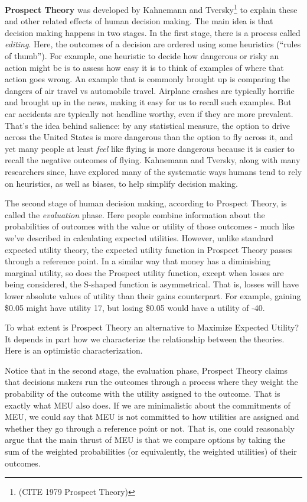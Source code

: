 \documentclass[]{tufte-book}
\begin{document}
\textbf{Prospect Theory} was developed by Kahnemann and Tversky\footnote{(CITE 1979 Prospect Theory)} to explain these and other related effects of human decision making. The main idea is that decision making happens in two stages. In the first stage, there is a process called \emph{editing}. Here, the outcomes of a decision are ordered using some heuristics (``rules of thumb''). For example, one heuristic to decide how dangerous or risky an action might be is to assess how easy it is to think of examples of where that action goes wrong. An example that is commonly brought up is comparing the dangers of air travel vs automobile travel. Airplane crashes are typically horrific and brought up in the news, making it easy for us to recall such examples. But car accidents are typically not headline worthy, even if they are more prevalent. That's the idea behind salience: by any statistical measure, the option to drive across the United States is more dangerous than the option to fly across it, and yet many people at least \emph{feel} like flying is more dangerous because it is easier to recall the negative outcomes of flying. Kahnemann and Tversky, along with many researchers since, have explored many of the systematic ways humans tend to rely on heuristics, as well as biases, to help simplify decision making.

The second stage of human decision making, according to Prospect Theory, is called the \emph{evaluation} phase. Here people combine information about the probabilities of outcomes with the value or utility of those outcomes - much like we've described in calculating expected utilities. However, unlike standard expected utility theory, the expected utility function in Prospect Theory passes through a reference point. In a similar way that money has a diminishing marginal utility, so does the Prospect utility function, except when losses are being considered, the S-shaped function is asymmetrical. That is, losses will have lower absolute values of utility than their gains counterpart. For example, gaining \$0.05 might have utility 17, but losing \$0.05 would have a utility of -40.

To what extent is Prospect Theory an alternative to Maximize Expected Utility? It depends in part how we characterize the relationship between the theories. Here is an optimistic characterization.

Notice that in the second stage, the evaluation phase, Prospect Theory claims that decisions makers run the outcomes through a process where they weight the probability of the outcome with the utility assigned to the outcome. That is exactly what MEU also does. If we are minimalistic about the commitments of MEU, we could say that MEU is not committed to how utilities are assigned and whether they go through a reference point or not. That is, one could reasonably argue that the main thrust of MEU is that we compare options by taking the sum of the weighted probabilities (or equivalently, the weighted utilities) of their outcomes.
\end{document}

